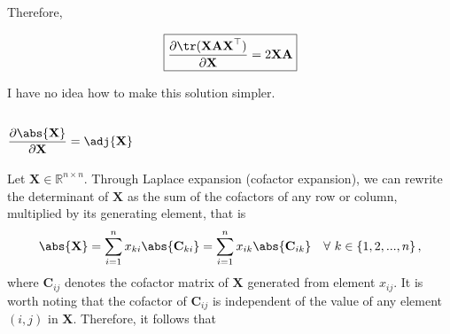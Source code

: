 Therefore,

\begin{align}
    \boxed{\dfrac{\partial \tr(\mathbf{XAX}^\top)}{\partial \mathbf{X}} = 2\mathbf{XA}}
\end{align}

I have no idea how to make this solution simpler.

\subsection{\(\dfrac{\partial \abs{\mathbf{X}}}{\partial \mathbf{X}} = \adj{\mathbf{X}}\)}
Let \(\mathbf{X} \in \mathbb{R}^{n\times n}\). Through Laplace expansion (cofactor expansion), we can rewrite the determinant of \(\mathbf{X}\) as the sum of the cofactors of any row or column, multiplied by its generating element, that is
\begin{align}
    \abs{\mathbf{X}} = \sum_{i = 1}^{n} x_{ki} \abs{\mathbf{C}_{ki}} = \sum_{i = 1}^{n} x_{ik} \abs{\mathbf{C}_{ik}} \,\,\,\,\,\, \forall \,\, k \in \left\{ 1, 2, ..., n \right\},
\end{align}
where \(\mathbf{C}_{ij}\) denotes the cofactor matrix of \(\mathbf{X}\) generated from element \(x_{ij}\). It is worth noting that the cofactor of \(\mathbf{C}_{ij}\) is independent of the value of any element \((i,j)\) in \(\mathbf{X}\). Therefore, it follows that
